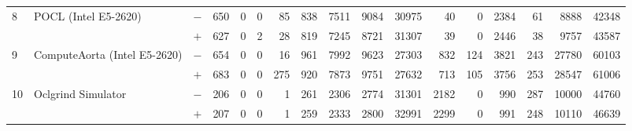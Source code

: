 \begin{tabular}{lll | rrrrrrr | rrrrrrr }
\hline
\multirow{ 2}{*}{8} & \multirow{ 2}{*}{POCL (Intel E5-2620)} & $-$ & 650 & 0 & 0 & 85 & 838 & 7511 & 9084       & 30975 & 40 & 0 & 2384 & 61 & 8888 & 42348 \\& & $+$ & 627 & 0 & 2 & 28 & 819 & 7245 & 8721 & 31307 & 39 & 0 & 2446 & 38 & 9757 & 43587 \\
\hline
\multirow{ 2}{*}{9} & \multirow{ 2}{*}{ComputeAorta (Intel E5-2620)} & $-$ & 654 & 0 & 0 & 16 & 961 & 7992 & 9623       & 27303 & 832 & 124 & 3821 & 243 & 27780 & 60103 \\& & $+$ & 683 & 0 & 0 & 275 & 920 & 7873 & 9751 & 27632 & 713 & 105 & 3756 & 253 & 28547 & 61006 \\
\hline
\multirow{ 2}{*}{10} & \multirow{ 2}{*}{Oclgrind Simulator} & $-$ & 206 & 0 & 0 & 1 & 261 & 2306 & 2774       & 31301 & 2182 & 0 & 990 & 287 & 10000 & 44760 \\& & $+$ & 207 & 0 & 0 & 1 & 259 & 2333 & 2800 & 32991 & 2299 & 0 & 991 & 248 & 10110 & 46639 \\
  \bottomrule
\end{tabular}

